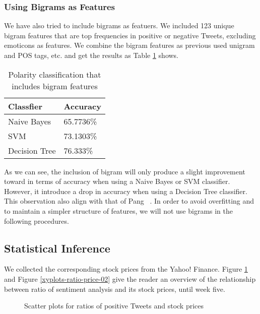 \documentclass[12pt]{article}
\begin{document}
\subsubsection{Using Bigrams as Features}

We have also tried to include bigrams as featuers. We included 123 unique bigram features that are top frequencies in positive or negative Tweets, excluding emoticons as features. We combine the bigram features as previous used unigram and POS tags, etc. and get the results as Table \ref{bigrams-polarity} shows.

\begin{table}
\begin{center}
    \begin{tabular}{ | l || l | }
        \hline
        \textbf{Classfier} &  \textbf{Accuracy} \\ \hline
        \hline
        Naive Bayes &  65.7736\% \\ \hline
        SVM & 73.1303\% \\ \hline
        Decision Tree & 76.333\% \\ \hline
    \end{tabular}
\caption{Polarity classification that includes bigram features}
\label{bigrams-polarity}
\end{center}
\end{table}

As we can see, the inclusion of bigram will only produce a slight improvement toward in terms of accuracy when using a Naive Bayes or SVM classifier. However, it introduce a drop in accuracy when using a Decision Tree classifier. This observation also align with that of Pang \etal~\cite{Pang:02}. In order to avoid overfitting and to maintain a simpler structure of features, we will not use bigrams in the following procedures.

\subsection{Statistical Inference}
We collected the corresponding stock prices from the Yahoo! Finance. Figure \ref{xyplots-ratio-price} and Figure \ref{xyplots-ratio-price-02} give the reader an overview of the relationship between ratio of sentiment analysis and its stock prices, until week five.

\begin{figure}
\centering
\caption{Scatter plots for ratios of positive Tweets and stock prices}
\label{xyplots-ratio-price}
\end{figure}
\end{document}
